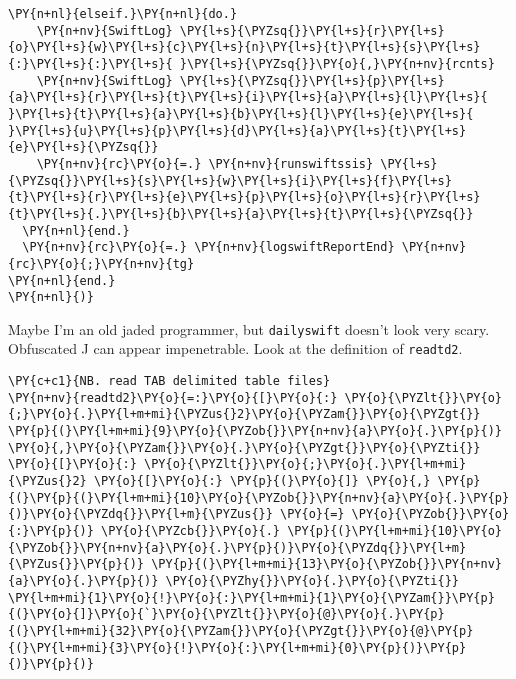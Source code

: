 \begin{tcolorbox}[breakable, size=fbox, boxrule=1pt, pad at break*=1mm,colback=cellbackground, colframe=cellborder]
\begin{Verbatim}[commandchars=\\\{\}]
  \PY{n+nl}{elseif.}\PY{n+nl}{do.} 
    \PY{n+nv}{SwiftLog} \PY{l+s}{\PYZsq{}}\PY{l+s}{r}\PY{l+s}{o}\PY{l+s}{w}\PY{l+s}{c}\PY{l+s}{n}\PY{l+s}{t}\PY{l+s}{s}\PY{l+s}{:}\PY{l+s}{:}\PY{l+s}{ }\PY{l+s}{\PYZsq{}}\PY{o}{,}\PY{n+nv}{rcnts}   
    \PY{n+nv}{SwiftLog} \PY{l+s}{\PYZsq{}}\PY{l+s}{p}\PY{l+s}{a}\PY{l+s}{r}\PY{l+s}{t}\PY{l+s}{i}\PY{l+s}{a}\PY{l+s}{l}\PY{l+s}{ }\PY{l+s}{t}\PY{l+s}{a}\PY{l+s}{b}\PY{l+s}{l}\PY{l+s}{e}\PY{l+s}{ }\PY{l+s}{u}\PY{l+s}{p}\PY{l+s}{d}\PY{l+s}{a}\PY{l+s}{t}\PY{l+s}{e}\PY{l+s}{\PYZsq{}}   
    \PY{n+nv}{rc}\PY{o}{=.} \PY{n+nv}{runswiftssis} \PY{l+s}{\PYZsq{}}\PY{l+s}{s}\PY{l+s}{w}\PY{l+s}{i}\PY{l+s}{f}\PY{l+s}{t}\PY{l+s}{r}\PY{l+s}{e}\PY{l+s}{p}\PY{l+s}{o}\PY{l+s}{r}\PY{l+s}{t}\PY{l+s}{.}\PY{l+s}{b}\PY{l+s}{a}\PY{l+s}{t}\PY{l+s}{\PYZsq{}}
  \PY{n+nl}{end.}
  \PY{n+nv}{rc}\PY{o}{=.} \PY{n+nv}{logswiftReportEnd} \PY{n+nv}{rc}\PY{o}{;}\PY{n+nv}{tg}
\PY{n+nl}{end.}
\PY{n+nl}{)}
\end{Verbatim}
\end{tcolorbox}

    Maybe I'm an old jaded programmer, but \texttt{dailyswift} doesn't look
very scary. Obfuscated J can appear impenetrable. Look at the
definition of \texttt{readtd2}. 

    \begin{tcolorbox}[breakable, size=fbox, boxrule=1pt, pad at break*=1mm,colback=cellbackground, colframe=cellborder]
\begin{Verbatim}[commandchars=\\\{\}]
\PY{c+c1}{NB. read TAB delimited table files}
\PY{n+nv}{readtd2}\PY{o}{=:}\PY{o}{[}\PY{o}{:} \PY{o}{\PYZlt{}}\PY{o}{;}\PY{o}{.}\PY{l+m+mi}{\PYZus{}2}\PY{o}{\PYZam{}}\PY{o}{\PYZgt{}} \PY{p}{(}\PY{l+m+mi}{9}\PY{o}{\PYZob{}}\PY{n+nv}{a}\PY{o}{.}\PY{p}{)} \PY{o}{,}\PY{o}{\PYZam{}}\PY{o}{.}\PY{o}{\PYZgt{}}\PY{o}{\PYZti{}} \PY{o}{[}\PY{o}{:} \PY{o}{\PYZlt{}}\PY{o}{;}\PY{o}{.}\PY{l+m+mi}{\PYZus{}2} \PY{o}{[}\PY{o}{:} \PY{p}{(}\PY{o}{]} \PY{o}{,} \PY{p}{(}\PY{p}{(}\PY{l+m+mi}{10}\PY{o}{\PYZob{}}\PY{n+nv}{a}\PY{o}{.}\PY{p}{)}\PY{o}{\PYZdq{}}\PY{l+m}{\PYZus{}} \PY{o}{=} \PY{o}{\PYZob{}}\PY{o}{:}\PY{p}{)} \PY{o}{\PYZcb{}}\PY{o}{.} \PY{p}{(}\PY{l+m+mi}{10}\PY{o}{\PYZob{}}\PY{n+nv}{a}\PY{o}{.}\PY{p}{)}\PY{o}{\PYZdq{}}\PY{l+m}{\PYZus{}}\PY{p}{)} \PY{p}{(}\PY{l+m+mi}{13}\PY{o}{\PYZob{}}\PY{n+nv}{a}\PY{o}{.}\PY{p}{)} \PY{o}{\PYZhy{}}\PY{o}{.}\PY{o}{\PYZti{}} \PY{l+m+mi}{1}\PY{o}{!}\PY{o}{:}\PY{l+m+mi}{1}\PY{o}{\PYZam{}}\PY{p}{(}\PY{o}{]}\PY{o}{`}\PY{o}{\PYZlt{}}\PY{o}{@}\PY{o}{.}\PY{p}{(}\PY{l+m+mi}{32}\PY{o}{\PYZam{}}\PY{o}{\PYZgt{}}\PY{o}{@}\PY{p}{(}\PY{l+m+mi}{3}\PY{o}{!}\PY{o}{:}\PY{l+m+mi}{0}\PY{p}{)}\PY{p}{)}\PY{p}{)}
\end{Verbatim}
\end{tcolorbox}


